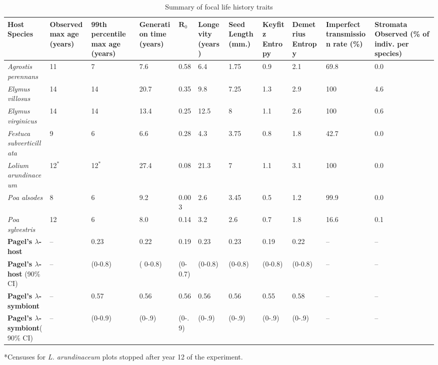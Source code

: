 \documentclass[lineno, sn-basic]{sn-jnl}%
\begin{document}
\begin{table}\centering
	\caption{Summary of focal life history traits }
	\setlength{\tabcolsep}{4pt}
	\begin{tabular}{lp{2cm}p{1.7cm}p{1.5cm}p{1cm}p{1.2cm}p{1.2cm}p{.9cm}p{1.2cm}p{1.5cm}p{1.6cm}}
		
		Host Species &\raggedright Observed max age (years)& \raggedright 99th percentile max age (years)&Generation time (years) & $\mathbf{R}_0$ &Longevity (years)&Seed Length (mm.)&\raggedright Keyfitz Entropy&\raggedright Demetrius Entropy&\raggedright Imperfect transmission rate (\%) & Stromata Observed (\% of indiv. per species)\\
		\midrule
		\emph{Agrostis perennans} &11&7&7.6&0.58&6.4&1.75&0.9&2.1&69.8&0.0\\
		\emph{Elymus villosus} &14&14&20.7&0.35&9.8&7.25&1.3&2.9&100&4.6\\
		\emph{Elymus virginicus} &14&14&13.4&0.25&12.5&8&1.1&2.6&100&0.6\\
		\emph{Festuca subverticillata} &9&6&6.6&0.28&4.3&3.75&0.8&1.8&42.7&0.0\\
		\emph{Lolium arundinaceum} &12$^*$&12$^*$&27.4&0.08&21.3&7&1.1&3.1&100&0.0\\
		\emph{Poa alsodes} &8&6&9.2&0.003&2.6&3.45&0.5&1.2&99.9&0.0\\
		\emph{Poa sylvestris}&12&6&8.0&0.14&3.2&2.6&0.7&1.8&16.6&0.1\\
		\midrule
		\textbf{Pagel's $\lambda$-host} &--&0.23&0.22&0.19&0.23&0.23&0.19&0.22&--&--\\
		\textbf{Pagel's $\lambda$-host} (90\% CI)&--&(0-0.8)&( 0-0.8)& (0-0.7)&(0-0.8)&(0-0.8)&(0-0.8)&(0-0.8)&--&--\\
		\textbf{Pagel's $\lambda$-symbiont}&--&0.57&0.56&0.56&0.56&0.56&0.55&0.58&--&--\\
		\textbf{Pagel's $\lambda$-symbiont}(90\% CI)&--&(0-0.9)&(0-.9)&(0-.9)&(0-.9)&(0-.9)&(0-.9)&(0-.9)&--&--\\
		\bottomrule
		
	\end{tabular}
	\raggedright\footnotesize{*Censuses for \emph{L. arundinaceum} plots stopped after year 12 of the experiment.}
\end{table}
\bigskip
\end{document}
